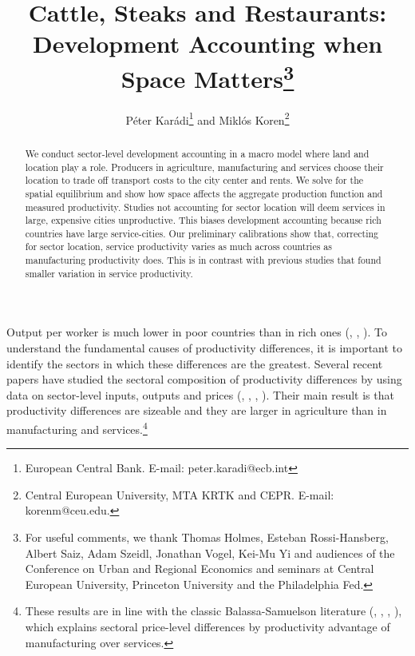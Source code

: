 \documentclass[12pt]{article}
\begin{document}
\title{Cattle, Steaks and Restaurants:\\ Development Accounting when Space Matters\thanks{For useful comments, we thank Thomas Holmes, Esteban Rossi-Hansberg, Albert Saiz, Adam Szeidl, Jonathan Vogel, Kei-Mu Yi and audiences of the Conference on Urban and Regional Economics and seminars at Central European University, Princeton University and the Philadelphia Fed.}}
\author{Péter Karádi\thanks{European Central Bank. E-mail: peter.karadi@ecb.int} and Miklós Koren\thanks{Central European University, MTA KRTK and CEPR. E-mail: korenm@ceu.edu.}}
\maketitle

\begin{abstract}
We conduct sector-level development accounting in a macro model where land and location play a role. Producers in agriculture, manufacturing and services choose their location to trade off transport costs to the city center and rents. We solve for the spatial equilibrium and show how space affects the aggregate production function and measured productivity. Studies not accounting for sector location will deem services in large, expensive cities unproductive. This biases development accounting because rich countries have large service-cities. Our preliminary calibrations show that, correcting for sector location, service productivity varies as much across countries as manufacturing productivity does. This is in contrast with previous studies that found smaller variation in service productivity.
\end{abstract}

Output per worker is much lower in poor countries than in rich ones (, , ). To understand the fundamental causes of productivity differences, it is important to identify the sectors in which these differences are the greatest. Several recent papers have studied the sectoral composition of productivity differences by using data on sector-level inputs, outputs and prices (, , , ). Their main result is that productivity differences are sizeable and they are larger in agriculture than in manufacturing and services.\footnote{These results are in line with the classic Balassa-Samuelson literature (, , , ), which explains sectoral price-level differences by productivity advantage of manufacturing over services.} 
\end{document}
